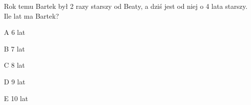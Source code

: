 \begin{tresc}
Rok temu Bartek był 2 razy starszy od Beaty, a dziś jest od niej o 4 lata starszy. Ile lat ma Bartek?
\end{tresc}
\begin{wariant}{A} 6 lat \end{wariant}
\begin{wariant}{B} 7 lat \end{wariant}
\begin{wariant}{C} 8 lat \end{wariant}
\begin{wariant}{D} 9 lat \end{wariant}
\begin{wariant}{E} 10 lat \end{wariant}

